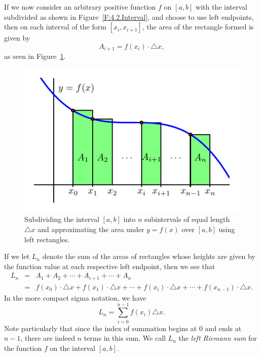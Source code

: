 If we now consider an arbitrary positive function $f$ on $[a,b]$ with the interval subdivided as shown in Figure~\ref{F:4.2.Interval}, and choose to use left endpoints, then on each interval of the form $[x_{i}, x_{i+1}]$, the area of the rectangle formed is given by
$$A_{i+1} = f(x_i) \cdot \triangle x,$$
as seen in Figure~\ref{F:4.2.LeftSum}.
\begin{figure}[h]
\begin{center}
\includegraphics{figures/4_2_LeftSum}
\caption{Subdividing the interval $[a,b]$ into $n$ subintervals of equal length $\triangle x$ and approximating the area under $y = f(x)$ over $[a,b]$ using left rectangles.} \label{F:4.2.LeftSum}
\end{center}
\end{figure}
If we let $L_n$ denote the sum of the areas of rectangles whose heights are given by the function value at each respective left endpoint, then we see that
\begin{eqnarray*}
L_n & = & A_1 + A_2 + \cdots + A_{i+1} + \cdots + A_n \\
	& = & f(x_0) \cdot \triangle x + f(x_1) \cdot \triangle x + \cdots + f(x_i) \cdot \triangle x + \cdots + f(x_{n-1}) \cdot \triangle x.
\end{eqnarray*}
In the more compact sigma notation, we have 
$$L_n = \sum_{i = 0}^{n-1} f(x_i) \triangle x.$$
Note particularly that since the index of summation begins at $0$ and ends at $n-1$, there are indeed $n$ terms in this sum.  We call $L_n$ the \emph{left Riemann sum}   for the function $f$ on the interval $[a,b]$.

